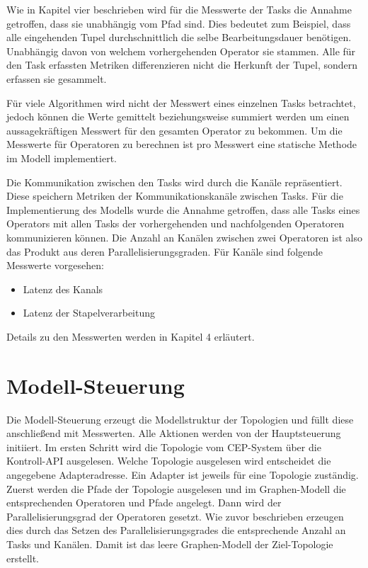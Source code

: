 Wie in Kapitel vier beschrieben wird für die Messwerte der Tasks die Annahme getroffen, dass sie unabhängig vom Pfad sind.
Dies bedeutet zum Beispiel, dass alle eingehenden Tupel durchschnittlich die selbe Bearbeitungsdauer benötigen.
Unabhängig davon von welchem vorhergehenden Operator sie stammen.
Alle für den Task erfassten Metriken differenzieren nicht die Herkunft der Tupel, sondern erfassen sie gesammelt.

Für viele Algorithmen wird nicht der Messwert eines einzelnen Tasks betrachtet, jedoch können die Werte gemittelt beziehungsweise summiert werden um einen aussagekräftigen Messwert für den gesamten Operator zu bekommen.
Um die Messwerte für Operatoren zu berechnen ist pro Messwert eine statische Methode im Modell implementiert.

Die Kommunikation zwischen den Tasks wird durch die Kanäle repräsentiert.
Diese speichern Metriken der Kommunikationskanäle zwischen Tasks.
Für die Implementierung des Modells wurde die Annahme getroffen, dass alle Tasks eines Operators mit allen Tasks der vorhergehenden und nachfolgenden Operatoren kommunizieren können.
Die Anzahl an Kanälen zwischen zwei Operatoren ist also das Produkt aus deren Parallelisierungsgraden.
Für Kanäle sind folgende Messwerte vorgesehen:

\begin{itemize}
\item{Latenz des Kanals}
\item{Latenz der Stapelverarbeitung}
\end{itemize}

Details zu den Messwerten werden in Kapitel 4 erläutert.

\section{Modell-Steuerung}

Die Modell-Steuerung erzeugt die Modellstruktur der Topologien und füllt diese anschließend mit Messwerten.
Alle Aktionen werden von der Hauptsteuerung initiiert.
Im ersten Schritt wird die Topologie vom CEP-System über die Kontroll-API ausgelesen.
Welche Topologie ausgelesen wird entscheidet die angegebene Adapteradresse.
Ein Adapter ist jeweils für eine Topologie zuständig.
Zuerst werden die Pfade der Topologie ausgelesen und im Graphen-Modell die entsprechenden Operatoren und Pfade angelegt.
Dann wird der Parallelisierungsgrad der Operatoren gesetzt.
Wie zuvor beschrieben erzeugen dies durch das Setzen des Parallelisierungsgrades die entsprechende Anzahl an Tasks und Kanälen.
Damit ist das leere Graphen-Modell der Ziel-Topologie erstellt.

